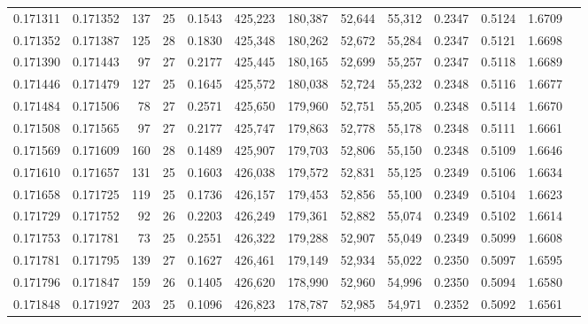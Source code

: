 \begin{tabular}{rrrrrrrrrrrrr}
0.171311 & 0.171352 & 137 &  25 &                                     0.1543 & 425,223 & 180,387 &  52,644 &  55,312 & 0.2347 & 0.5124 & 1.6709 \\
0.171352 & 0.171387 & 125 &  28 &                                     0.1830 & 425,348 & 180,262 &  52,672 &  55,284 & 0.2347 & 0.5121 & 1.6698 \\
0.171390 & 0.171443 &  97 &  27 &                                     0.2177 & 425,445 & 180,165 &  52,699 &  55,257 & 0.2347 & 0.5118 & 1.6689 \\
0.171446 & 0.171479 & 127 &  25 &                                     0.1645 & 425,572 & 180,038 &  52,724 &  55,232 & 0.2348 & 0.5116 & 1.6677 \\
0.171484 & 0.171506 &  78 &  27 &                                     0.2571 & 425,650 & 179,960 &  52,751 &  55,205 & 0.2348 & 0.5114 & 1.6670 \\
0.171508 & 0.171565 &  97 &  27 &                                     0.2177 & 425,747 & 179,863 &  52,778 &  55,178 & 0.2348 & 0.5111 & 1.6661 \\
0.171569 & 0.171609 & 160 &  28 &                                     0.1489 & 425,907 & 179,703 &  52,806 &  55,150 & 0.2348 & 0.5109 & 1.6646 \\
0.171610 & 0.171657 & 131 &  25 &                                     0.1603 & 426,038 & 179,572 &  52,831 &  55,125 & 0.2349 & 0.5106 & 1.6634 \\
0.171658 & 0.171725 & 119 &  25 &                                     0.1736 & 426,157 & 179,453 &  52,856 &  55,100 & 0.2349 & 0.5104 & 1.6623 \\
0.171729 & 0.171752 &  92 &  26 &                                     0.2203 & 426,249 & 179,361 &  52,882 &  55,074 & 0.2349 & 0.5102 & 1.6614 \\
0.171753 & 0.171781 &  73 &  25 &                                     0.2551 & 426,322 & 179,288 &  52,907 &  55,049 & 0.2349 & 0.5099 & 1.6608 \\
0.171781 & 0.171795 & 139 &  27 &                                     0.1627 & 426,461 & 179,149 &  52,934 &  55,022 & 0.2350 & 0.5097 & 1.6595 \\
0.171796 & 0.171847 & 159 &  26 &                                     0.1405 & 426,620 & 178,990 &  52,960 &  54,996 & 0.2350 & 0.5094 & 1.6580 \\
0.171848 & 0.171927 & 203 &  25 &                                     0.1096 & 426,823 & 178,787 &  52,985 &  54,971 & 0.2352 & 0.5092 & 1.6561 \\

\end{tabular}
